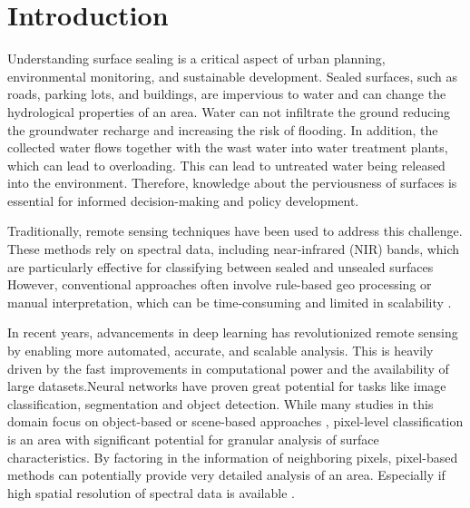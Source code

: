 

\section{Introduction}
\label{introduction}

Understanding surface sealing is a critical aspect of urban planning, environmental 
monitoring, and sustainable development. Sealed surfaces, such as roads, parking lots, 
and buildings, are impervious to water and can change the hydrological properties of
an area. Water can not infiltrate the ground reducing the groundwater recharge and
increasing the risk of flooding. In addition, the collected water flows together with
the wast water into water treatment plants, which can lead to overloading. This
can lead to untreated water being released into the environment. Therefore,
knowledge about the perviousness of surfaces is essential for informed decision-making
and policy development.

Traditionally, remote sensing techniques have been used to address this challenge. 
These methods rely on spectral data, including near-infrared (NIR) bands, which are 
particularly effective for classifying between sealed and unsealed surfaces
However, conventional approaches often involve rule-based geo processing or manual interpretation, 
which can be time-consuming and limited in scalability \autocite{kadhimAdvancesRemoteSensing2016}.

In recent years, advancements in deep learning has revolutionized remote sensing by 
enabling more automated, accurate, and scalable analysis. This is heavily driven
by the fast improvements in computational power and the availability of large
datasets.Neural networks have proven great potential for tasks like image classification,
segmentation and object detection. While many studies in this domain focus on object-based or scene-based 
approaches \autocite{thapaDeepLearningRemote2023}, pixel-level classification is 
an area with significant potential for granular analysis of surface characteristics.
By factoring in the information of neighboring pixels, pixel-based methods can 
potentially provide very detailed analysis of an area. Especially if high spatial
resolution of spectral data is available \autocite{zhengHighSpatialResolution2023}.

